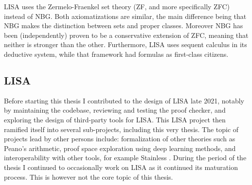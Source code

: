 LISA uses the Zermelo-Fraenkel set theory (ZF, and more specifically ZFC) instead of NBG. Both axiomatizations are similar, the main difference being that NBG makes the distinction between sets and proper classes. Moreover NBG has been (independently) proven to be a conservative extension of ZFC, meaning that neither is stronger than the other. Furthermore, LISA uses sequent calculus in its deductive system, while that framework had formulas as first-class citizens.

\subsection{LISA}

Before starting this thesis I contributed to the design of LISA late 2021, notably by maintaining the codebase, reviewing and testing the proof checker, and exploring the design of third-party tools for LISA. This LISA project then ramified itself into several sub-projects, including this very thesis. The topic of projects lead by other persons include: formalization of other theories such as Peano's arithmetic, proof space exploration using deep learning methods, and interoperability with other tools, for example Stainless \cite{Kuncak2021}. During the period of the thesis I continued to occasionally work on LISA as it continued its maturation process. This is however not the core topic of this thesis.
